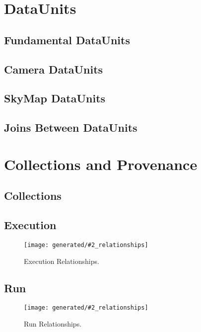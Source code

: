 \documentclass[DM,toc]{lsstdoc}
\newcommand{\coltable}[1]{
    \begin{table}
        {\footnotesize
        }
        \caption{#1 Columns}
        \label{tbl:#1}
    \end{table}
}
\newcommand{\relgraph}[2][width=0.8\textwidth]{
    \begin{figure}
        \centering
        \texttt{[image: generated/\#2\_relationships]}
        \caption{#2 Relationships.}
        \label{rel:#2}
    \end{figure}
}
\begin{document}
\coltable{DatasetComposition}

\section{DataUnits}
\label{sec:dataunits}

\subsection{Fundamental DataUnits}
\label{sec:fundamental-dataunits}

\subsection{Camera DataUnits}
\label{sec:camera-dataunits}

\subsection{SkyMap DataUnits}
\label{sec:skymap-dataunits}

\subsection{Joins Between DataUnits}
\label{sec:joins-between-dataunits}


\section{Collections and Provenance}
\label{sec:collections-and-provenance}

\subsection{Collections}
\label{sec:collections}

\coltable{DatasetCollection}

\subsection{Execution}
\label{sec:excution}

\coltable{Execution}
\relgraph{Execution}

\subsection{Run}
\label{sec:run}

\coltable{Run}
\relgraph{Run}
\end{document}
